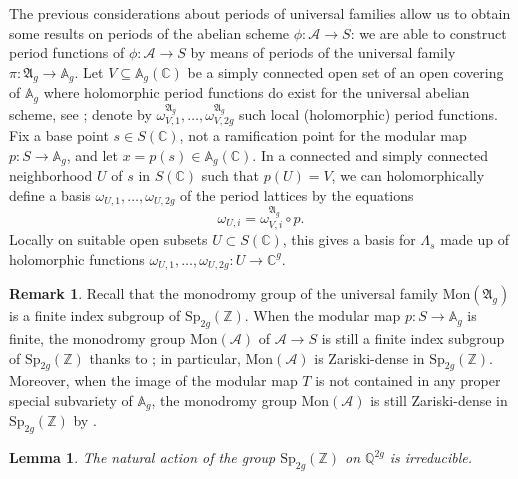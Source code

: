 \documentclass[10 pt,a4paper]{article}
\theoremstyle{plain}
\newtheorem{lem}[thm]{Lemma}
\theoremstyle{definition}
\newtheorem{rem}[thm]{Remark}
\theoremstyle{named}
\newcommand{\bA}{\mathbb A}
\newcommand{\cA}{\mathcal A}
\newcommand{\fA}{\mathfrak A}
\newcommand{\bC}{\mathbb C}
\newcommand{\bQ}{\mathbb Q}
\newcommand{\bZ}{\mathbb Z}
\begin{document}
The previous considerations about periods of universal families allow us to obtain some results on periods of the abelian scheme $\phi:\cA \to S$: we are able to construct period functions of $\phi: \cA \to S$ by means of periods of the universal family $\pi:\fA_g \to \bA_g$. Let $V \subseteq \bA_g(\bC)$ be a simply connected open set of an open covering of $\bA_g$ where holomorphic period functions do exist for the universal abelian scheme, see ; denote by $\omega^{\fA_g}_{V,1}, \ldots, \omega^{\fA_g}_{V,2g}$ such local (holomorphic) period functions. Fix a base point $s \in S(\bC)$, not a ramification point for the modular map $p:S \rightarrow \bA_g$, and let $x = p(s) \in \bA_g(\bC)$. In a connected and simply connected neighborhood $U$ of $s$ in $S(\bC)$ such that $p(U)=V$, we can holomorphically define a basis $\omega_{U,1}, \ldots, \omega_{U,2g}$ of the period lattices by the equations
\begin{equation}\label{periodFunctions}
    \omega_{U,i} = \omega^{\fA_g}_{V,i}\circ p.
\end{equation}
Locally on suitable open subsets $U \subset S(\bC)$, this gives a basis for $\Lambda_s$ made up of holomorphic functions $\omega_{U,1}, \ldots, \omega_{U,2g}:U \rightarrow \bC^g$.

\begin{rem}\label{densityMon}
    Recall that the monodromy group of the universal family $\textrm{Mon}(\fA_g)$ is a finite index subgroup of $\textrm{Sp}_{2g}(\bZ)$. When the modular map $p:S \to \bA_g$ is finite, the monodromy group $\textrm{Mon}(\cA)$ of $\cA \to S$ is still a finite index subgroup of $\textrm{Sp}_{2g}(\bZ)$ thanks to ; in particular, $\textrm{Mon}(\cA)$ is Zariski-dense in $\textrm{Sp}_{2g}(\bZ)$. Moreover, when the image of the modular map $T$ is not contained in any proper special subvariety of $\bA_g$, the monodromy group $\textrm{Mon}(\cA)$ is still Zariski-dense in $\textrm{Sp}_{2g}(\bZ)$ by \cite[Remark 10.1.2]{ACZ}. %
\end{rem}

\begin{lem}\label{irrSp}
    The natural action of the group $\textrm{Sp}_{2g}(\bZ)$ on $\bQ^{2g}$ is irreducible.
\end{lem}
\end{document}
